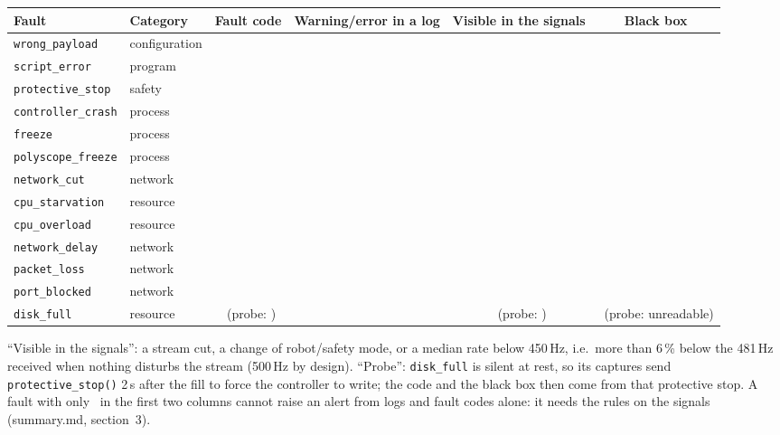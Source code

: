 \documentclass[10pt]{article}
\newcommand{\yes}{\textcolor{ok}{\ding{51}}}
\newcommand{\no}{\textcolor{no}{\ding{55}}}
\begin{document}
\vspace{4pt}
\begin{tabular}{@{}llcccc@{}}
\toprule
\textbf{Fault} & \textbf{Category} & \textbf{Fault code} & \textbf{Warning/error in a log} & \textbf{Visible in the signals} & \textbf{Black box} \\
\midrule
\texttt{wrong\_\allowbreak{}payload} & configuration & \no & \no & \no & \no \\
\texttt{script\_\allowbreak{}error} & program & \no & \yes & \no & \no \\
\texttt{protective\_\allowbreak{}stop} & safety & \yes & \yes & \yes & \yes \\
\texttt{controller\_\allowbreak{}crash} & process & \no & \yes & \yes & \no \\
\texttt{freeze} & process & \no & \no & \yes & \no \\
\texttt{polyscope\_\allowbreak{}freeze} & process & \no & \yes & \no & \no \\
\texttt{network\_\allowbreak{}cut} & network & \no & \yes & \yes & \yes \\
\texttt{cpu\_\allowbreak{}starvation} & resource & \no & \no & \yes & \no \\
\texttt{cpu\_\allowbreak{}overload} & resource & \no & \no & \yes & \no \\
\texttt{network\_\allowbreak{}delay} & network & \no & \yes & \yes & \no \\
\texttt{packet\_\allowbreak{}loss} & network & \no & \yes & \yes & \no \\
\texttt{port\_\allowbreak{}blocked} & network & \no & \yes & \yes & \no \\
\texttt{disk\_\allowbreak{}full} & resource & \no\ (probe: \yes) & \yes & \no\ (probe: \yes) & \no\ (probe: unreadable) \\
\bottomrule
\end{tabular}

\smallskip
{\small ``Visible in the signals'': a stream cut, a change of robot/safety mode, or a median rate below 450\,Hz,
i.e.\ more than 6\,\% below the 481\,Hz received when nothing disturbs the stream (500\,Hz by design). ``Probe'':
\texttt{disk\_full} is silent at rest, so its captures send \texttt{protective\_stop()} 2\,s after the fill to force
the controller to write; the code and the black box then come from that protective stop. A fault with only \no\ in the first two columns cannot raise an alert from logs and fault codes
alone: it needs the rules on the signals (summary.md, section~3).}
\end{document}
